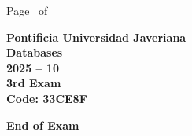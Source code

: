 \documentclass[11pt, addpoints, answers]{exam}\usepackage[utf8]{inputenc}
\begin{document}
\begin{coverpages}
\begin{center}
			\vspace{3mm}
			\leavevmode \hspace{5mm} 
		\end{center}
	\end{coverpages}

	\footer{} {Page \thepage\ of \numpages} {}

	\centering
	\textbf{\Large Pontificia Universidad Javeriana}\\
	\textbf{\Large Databases} \\
	\textbf{\large 2025 -- 10} \\
	\textbf{\large 3rd Exam} \\
	\textbf{Code: 33CE8F}


	\begin{questions}
		
		
		
		
		
		
		
		
		
		
		
		
		
		
		
		
		
		
		
		
	\end{questions}

	\vspace{5mm}
	\noindent \textbf{End of Exam}
\end{document}
